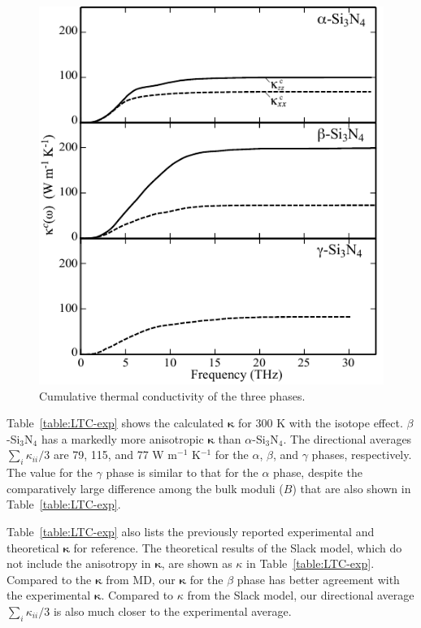 \documentclass[twocolumn,amsmath,amssymb,a4paper,prb,superscriptaddress,floatfix]{revtex4-1}
\begin{document}
\begin{figure}[H]
         \begin{center}
                   \includegraphics[width=0.90\linewidth]{Figure_kaccum_for_alpha_beta_gamma_phases_iso.pdf}
                   \caption{Cumulative thermal conductivity of the three phases.
                   \label{fig:kaccum} }
    \end{center}
\end{figure}
Table~\ref{table:LTC-exp} shows the calculated
$\boldsymbol{\kappa}$ for 300 K with the isotope effect. $\beta$-Si$_3$N$_4$ has a markedly more
anisotropic $\boldsymbol{\kappa}$ than $\alpha$-Si$_3$N$_4$.  The directional
averages $\sum_i \kappa_{ii}/3$  are 79, 115,  and 77 W m$^{-1}$ K$^{-1}$ for the
$\alpha$, $\beta$, and $\gamma$ phases, respectively. The value for the
$\gamma$ phase is similar to that for the $\alpha$ phase, despite the
comparatively large difference among the bulk moduli ($B$) that are also shown
in Table~\ref{table:LTC-exp}.

Table~\ref{table:LTC-exp} also lists the previously reported
experimental\cite{li} and theoretical\cite{hirosaki-md} $\boldsymbol{\kappa}$
for reference. The theoretical results\cite{morelli} of the Slack model, which
do not include the anisotropy in $\boldsymbol{\kappa}$, are shown as $\kappa$ in
Table~\ref{table:LTC-exp}. Compared to the $\boldsymbol{\kappa}$ from
MD\cite{hirosaki-md}, our $\boldsymbol{\kappa}$ for the $\beta$ phase has better
agreement with the experimental $\boldsymbol{\kappa}$.  Compared to $\kappa$
from the Slack model, our directional average $\sum_i \kappa_{ii}/3$ is also
much closer to the experimental average.
\end{document}
